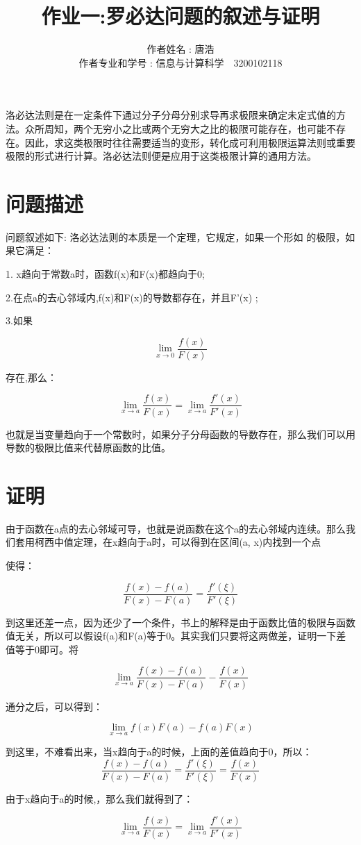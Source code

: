 \documentclass{ctexart}
\title{作业一:罗必达问题的叙述与证明}
\author{作者姓名 : 唐浩 \\ 作者专业和学号 : 信息与计算科学　3200102118}
\begin{document}
\maketitle


洛必达法则是在一定条件下通过分子分母分别求导再求极限来确定未定式值的方法。众所周知，两个无穷小之比或两个无穷大之比的极限可能存在，也可能不存在。因此，求这类极限时往往需要适当的变形，转化成可利用极限运算法则或重要极限的形式进行计算。洛必达法则便是应用于这类极限计算的通用方法。
\section{问题描述}
问题叙述如下: 洛必达法则的本质是一个定理，它规定，如果一个形如
的极限，如果它满足：

1. x趋向于常数a时，函数f(x)和F(x)都趋向于0;

2.在点a的去心邻域内,f(x)和F(x)的导数都存在，并且{F'(x) {}};

3.如果

\[
\lim_{x \rightarrow 0}
\frac{f(x)}{F(x)}
\]

存在,那么：

\[
\lim_{x \rightarrow a}
\frac{f(x)}{F(x)} =
\lim_{x \rightarrow a}
\frac{f'(x)}{F'(x)}
\]

也就是当变量趋向于一个常数时，如果分子分母函数的导数存在，那么我们可以用导数的极限比值来代替原函数的比值。

\section{证明}
由于函数在a点的去心邻域可导，也就是说函数在这个a的去心邻域内连续。那么我们套用柯西中值定理，在x趋向于a时，可以得到在区间(a, x)内找到一个点 \xi

使得：

\[
\frac{f(x) - f(a)}{F(x) - F(a)} =
\frac{f'(\xi)}{F'(\xi)}
\]

到这里还差一点，因为还少了一个条件，书上的解释是由于函数比值的极限与函数值无关，所以可以假设f(a)和F(a)等于0。其实我们只要将这两做差，证明一下差值等于0即可。将

\[
\lim_{x \rightarrow a}
\frac{f(x) - f(a)}{F(x) - F(a)} -
\frac{f(x)}{F(x)}
\]

通分之后，可以得到：

\[
\lim_{x \rightarrow a} f(x)F(a) - f(a)F(x)
\]

到这里，不难看出来，当x趋向于a的时候，上面的差值趋向于0，所以：
\[
\frac{f(x) - f(a)}{F(x) - F(a)} =
\frac{f'(\xi)}{F'(\xi)} =
\frac{f(x)}{F(x)}
\]

由于x趋向于a的时候,，那么我们就得到了：

\[
\lim_{x \rightarrow a}
\frac{f(x)}{F(x)} =
\lim_{x \rightarrow a}
\frac{f'(x)}{F'(x)}
\]
\end{document}
